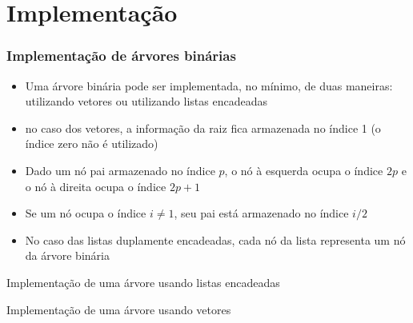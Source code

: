 \section{Implementação}

\begin{frame}
    \frametitle{Implementação de árvores binárias}

    \begin{itemize}
        \item Uma árvore binária pode ser {implementada}, no mínimo, de 
        {duas} maneiras: utilizando vetores ou utilizando listas encadeadas
        

        \item no caso dos vetores, a informação da raiz fica armazenada no índice 1 (o índice
            zero não é utilizado)
            
        \item Dado um nó pai armazenado no índice $p$, o nó à esquerda ocupa o índice $2p$ e o
            nó à direita ocupa o índice $2p + 1$

        \item Se um nó ocupa o índice $i\neq 1$, seu pai está armazenado no índice $i/2$

        \item No caso das listas duplamente encadeadas, cada {nó} da lista representa um nó da 
            árvore binária
    \end{itemize}

\end{frame}

\begin{frame}[fragile]{Implementação de uma árvore usando listas encadeadas}
\end{frame}

\begin{frame}[fragile]{Implementação de uma árvore usando vetores}
\end{frame}
